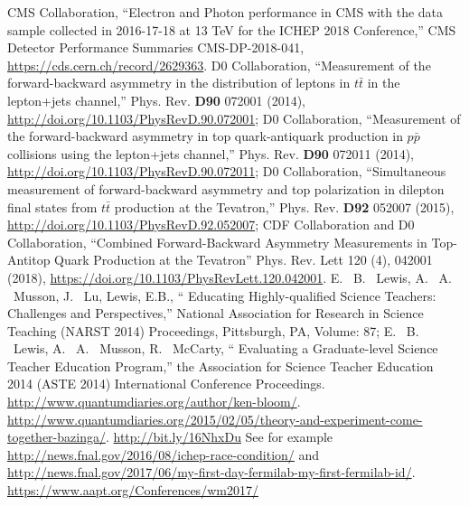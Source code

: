 \begin{thebibliography}{99}
%
    CMS Collaboration, ``Electron and Photon performance in CMS with the data sample collected in 2016-17-18 at 13 TeV for the ICHEP 2018 Conference,''
    CMS Detector Performance Summaries CMS-DP-2018-041, \url{https://cds.cern.ch/record/2629363}.
%
%
%
D0 Collaboration, ``Measurement of the forward-backward asymmetry in the distribution of leptons in $t\bar{t}$ in the lepton+jets channel,'' Phys. Rev. {\bf D90} 072001 (2014), \url{http://doi.org/10.1103/PhysRevD.90.072001};
D0 Collaboration, ``Measurement of the forward-backward asymmetry in top quark-antiquark production in $p\bar{p}$ collisions using the lepton+jets channel,'' Phys. Rev. {\bf D90} 072011 (2014), \url{http://doi.org/10.1103/PhysRevD.90.072011};
D0 Collaboration, ``Simultaneous measurement of forward-backward asymmetry and top polarization in dilepton final states from $t\bar{t}$ production at the Tevatron,'' Phys. Rev. {\bf D92} 052007 (2015), \url{http://doi.org/10.1103/PhysRevD.92.052007};
CDF Collaboration and D0 Collaboration, ``Combined Forward-Backward Asymmetry Measurements in Top-Antitop Quark Production at the Tevatron'' Phys. Rev. Lett 120 (4), 042001 (2018), \url{https://doi.org/10.1103/PhysRevLett.120.042001}.
%
%
E. ~B. ~Lewis, A. ~A. ~Musson, J. ~Lu, Lewis, E.B., `` Educating Highly-qualified Science Teachers: Challenges and Perspectives,” National Association for Research in Science Teaching (NARST 2014) Proceedings, Pittsburgh, PA, Volume: 87; 
E. ~B. ~Lewis, A. ~A. ~Musson, R. ~McCarty, `` Evaluating a Graduate-level Science Teacher Education Program,” the Association for Science Teacher Education 2014 (ASTE 2014) International Conference Proceedings.
%
 \url{http://www.quantumdiaries.org/author/ken-bloom/}.
%
 \url{http://www.quantumdiaries.org/2015/02/05/theory-and-experiment-come-together-bazinga/}.
%
 \url{http://bit.ly/16NhxDu}
%
 See for example \url{http://news.fnal.gov/2016/08/ichep-race-condition/} and \url{http://news.fnal.gov/2017/06/my-first-day-fermilab-my-first-fermilab-id/}.
%
 \url{https://www.aapt.org/Conferences/wm2017/}

\end{thebibliography}

